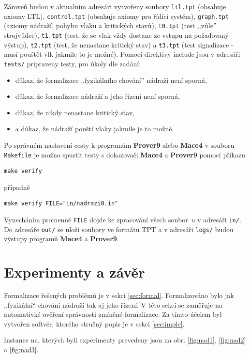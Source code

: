 \documentclass[a4paper,journal]{IEEEtran}
\begin{document}
Zároveň budou v aktualním adresári vytvořeny
soubory \texttt{ltl.tpt} (obsahuje axiomy LTL), \texttt{control.tpt} (obsahuje axiomy pro řídící systém), 
\texttt{graph.tpt}	(axiomy nádraží, pohybu vlaku a kritických stavů), 
\texttt{t0.tpt} (test ,,vůle'' strojvůdce), \texttt{t1.tpt} (test, že se vlak vždy dostane ze vstupu na požadovaný výstup), 
\texttt{t2.tpt} (test, že nenastane kritický stav) a \texttt{t3.tpt} (test  signalizace - musí pouštět vlk jakmile to je možné).
Pomocí direktivy include jsou v adresáři \texttt{tests/} pripraveny testy, pro úkoly dle zadání:
\begin{itemize}
\item důkaz, že formalizace ,,fyzikálního chování'' nádraží není sporná,
\item důkaz, že formalizace nádraží a jeho řízení není sporná,
\item důkaz, že nikdy nenastane kritický stav,
\item a důkaz, že nádraží pouští vlaky jakmile je to možné.
\end{itemize}

Po správném nastavení cesty k programům \textbf{Prover9} alebo \textbf{Mace4} v souboru \texttt{Makefile} je možno spustit testy s dokazovači \textbf{Mace4} a \textbf{Prover9} pomocí příkazu
\begin{verbatim}
make verify
\end{verbatim}
případně
\begin{verbatim}
make verify FILE="in/nadrazi0.in"
\end{verbatim}
Vynecháním promenné \texttt{FILE} dojde ke zpracování všech soubor~u v adresáři \texttt{in/}. Do adresáře \texttt{out/}
se uloží soubory ve formátu TPT a v adresáři \texttt{logs/} budou výstupy programů \textbf{Mace4} a \textbf{Prover9}.



\section{Experimenty a závěr} \label{sec:exp}
Formalizace řešených problémů je v sekci \ref{sec:formal}. Formalizováno bylo jak ,,fyzikální`` chování nádraží 
tak aj jeho řízení. V této sekci se zaměřuje na automativké ověření správnosti zmíněné formalizace.
Za tímto účelem byl vytvořen softvér, ktorého stručný popis je v sekci \ref{sec:imple}.

Instance na, kterých byli experimenty prevedeny jsou na obr. \ref{fig:nad1}, \ref{fig:nad2} a \ref{fig:nad3}.
\end{document}
